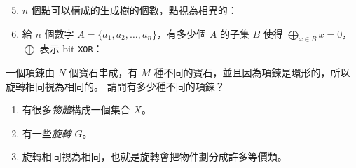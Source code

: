 \documentclass[standalone]{beamer}
\begin{document}
\begin{frame}
  \begin{enumerate}[<+->]
    \setcounter{enumi}{4}
  \item $n$ 個點可以構成的生成樹的個數，點視為相異的： \\[2ex]
  \item 給 $n$ 個數字 $A = \{a_1, a_2, \dots, a_n\}$，有多少個 $A$ 的子集 $B$
    使得 $\bigoplus_{x \in B} x = 0$，$\bigoplus$ 表示 bit \texttt{XOR}：
  \end{enumerate}
\end{frame}

\begin{frame}{}
  \begin{problem}[經典問題]
    一個項鍊由 $N$ 個寶石串成，有 $M$ 種不同的寶石，並且因為項鍊是環形的，所以旋轉相同視為相同的。
    請問有多少種不同的項鍊？
  \end{problem}
  \pause

  \begin{enumerate}
    \item 有很多\emph{物體}構成一個集合 $X$。
    \item 有一些\emph{旋轉} $G$。
    \item 旋轉相同視為相同，也就是旋轉會把物件劃分成許多等價類。
  \end{enumerate}
\end{frame}

\newcommand{\chain}[6][]{
  \begin{scope}[#1 shift={#2}, w/.style={fill=white}, b/.style={fill=black}, nd/.style={draw, circle}]
    \draw (0, 0) circle (0.3);
    \node[nd] at (0:0.3) [#3] {};
    \node[nd] at (90:0.3) [#4] {};
    \node[nd] at (180:0.3) [#5] {};
    \node[nd] at (270:0.3) [#6] {};
  \end{scope}
}
\end{document}
